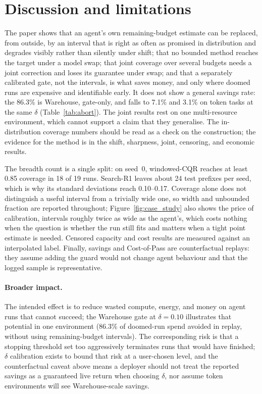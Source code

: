 \documentclass{article}
\begin{document}
\flushbottom
\section{Discussion and limitations}
\label{sec:discussion}

The paper shows that an agent's own remaining-budget estimate can be replaced, from outside, by an interval that is right as often as promised in distribution and degrades visibly rather than silently under shift; that no bounded method reaches the target under a model swap; that joint coverage over several budgets needs a joint correction and loses its guarantee under swap; and that a separately calibrated gate, not the intervals, is what saves money, and only where doomed runs are expensive and identifiable early. It does not show a general savings rate: the 86.3\% is Warehouse, gate-only, and falls to 7.1\% and 3.1\% on token tasks at the same $\delta$ (Table~\ref{tab:abort}). The joint results rest on one multi-resource environment, which cannot support a claim that they generalise. The in-distribution coverage numbers should be read as a check on the construction; the evidence for the method is in the shift, sharpness, joint, censoring, and economic results.

The breadth count is a single split: on seed~0, windowed-CQR reaches at least 0.85 coverage in 18 of 19 runs. Search-R1 leaves about 24 test prefixes per seed, which is why its standard deviations reach 0.10--0.17. Coverage alone does not distinguish a useful interval from a trivially wide one, so width and unbounded fraction are reported throughout; Figure~\ref{fig:case_study} also shows the price of calibration, intervals roughly twice as wide as the agent's, which costs nothing when the question is whether the run still fits and matters when a tight point estimate is needed. Censored capacity and cost results are measured against an interpolated label. Finally, savings and Cost-of-Pass are counterfactual replays: they assume adding the guard would not change agent behaviour and that the logged sample is representative.

\paragraph{Broader impact.}
The intended effect is to reduce wasted compute, energy, and money on agent runs that cannot succeed; the Warehouse gate at $\delta{=}0.10$ illustrates that potential in one environment (86.3\% of doomed-run spend avoided in replay, without using remaining-budget intervals). The corresponding risk is that a stopping threshold set too aggressively terminates runs that would have finished; $\delta$ calibration exists to bound that risk at a user-chosen level, and the counterfactual caveat above means a deployer should not treat the reported savings as a guaranteed live return when choosing $\delta$, nor assume token environments will see Warehouse-scale savings.
\end{document}
